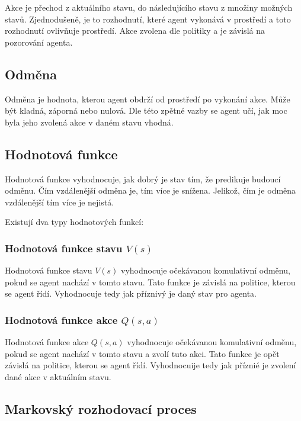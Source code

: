 Akce je přechod z aktuálního stavu, do následujícího stavu z množiny možných stavů.
  Zjednodušeně, je to rozhodnutí, které agent vykonává v prostředí a toto rozhodnutí ovlivňuje prostředí.
  Akce zvolena dle politiky a je závislá na pozorování agenta.
  
  \subsection{Odměna}\label{subsec:odmena}

Odměna je hodnota, kterou agent obdrží od prostředí po vykonání akce.
  Může být kladná, záporná nebo nulová.
  Dle této zpětné vazby se agent učí, jak moc byla jeho zvolená akce v daném stavu vhodná.

\subsection{Hodnotová funkce}\label{subsec:hodnotova-funkce}

Hodnotová funkce vyhodnocuje, jak dobrý je stav tím, že predikuje budoucí odměnu.
  Čím vzdálenější odměna je, tím více je snížena.
  Jelikož, čím je odměna vzdálenější tím více je nejistá.

  Existují dva typy hodnotových funkcí:

  \subsubsection*{Hodnotová funkce stavu $V(s)$}

  Hodnotová funkce stavu \emph{$V(s)$} vyhodnocuje očekávanou komulativní odměnu, pokud se agent nachází v tomto stavu.
  Tato funkce je závislá na politice, kterou se agent řídí.
  Vyhodnocuje tedy jak příznivý je daný stav pro agenta.

  \subsubsection*{Hodnotová funkce akce $Q(s, a)$}
  \label{subsubsec:q_function}

  Hodnotová funkce akce \emph{$Q(s, a)$} vyhodnocuje očekávanou komulativní odměnu, pokud se agent nachází v tomto stavu a zvolí tuto akci.
  Tato funkce je opět závislá na politice, kterou se agent řídí.
  Vyhodnocuije tedy jak příznié je zvolení dané akce v aktuálním stavu.


\subsection{Markovský rozhodovací proces}\label{subsec:markovsky-rozhodovaci-proces}


